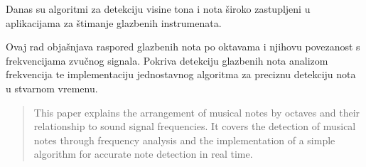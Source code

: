 \documentclass[times, utf8, diplomski, numeric]{fer}
\begin{document}
Danas su algoritmi za detekciju visine tona i nota široko zastupljeni u aplikacijama za štimanje glazbenih instrumenata.




\begin{sazetak}
Ovaj rad objašnjava raspored glazbenih nota po oktavama i njihovu povezanost s frekvencijama zvučnog signala. Pokriva detekciju glazbenih nota analizom frekvencija te implementaciju jednostavnog algoritma za preciznu detekciju nota u stvarnom vremenu.

\end{sazetak}

\begin{abstract}
This paper explains the arrangement of musical notes by octaves and their relationship to sound signal frequencies. It covers the detection of musical notes through frequency analysis and the implementation of a simple algorithm for accurate note detection in real time.

\end{abstract}
\end{document}
